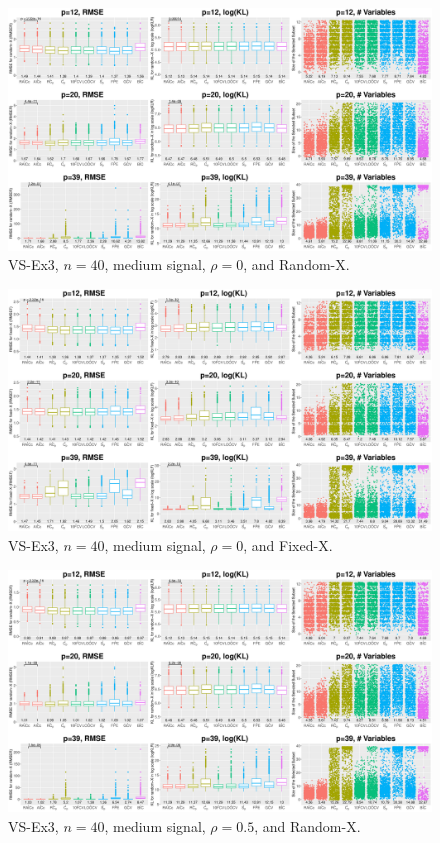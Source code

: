 \clearpage
\begin{figure}[!ht]
\centering
\includegraphics[width=\textwidth]{figures/supplement/randomx_VS-Ex3_n40_msnr_rho0.eps}
\caption{VS-Ex3, $n=40$, medium signal, $\rho=0$, and Random-X.}
\end{figure}
\begin{figure}[!ht]
\centering
\includegraphics[width=\textwidth]{figures/supplement/fixedx_VS-Ex3_n40_msnr_rho0.eps}
\caption{VS-Ex3, $n=40$, medium signal, $\rho=0$, and Fixed-X.}
\end{figure}
\clearpage
\begin{figure}[!ht]
\centering
\includegraphics[width=\textwidth]{figures/supplement/randomx_VS-Ex3_n40_msnr_rho05.eps}
\caption{VS-Ex3, $n=40$, medium signal, $\rho=0.5$, and Random-X.}
\end{figure}
